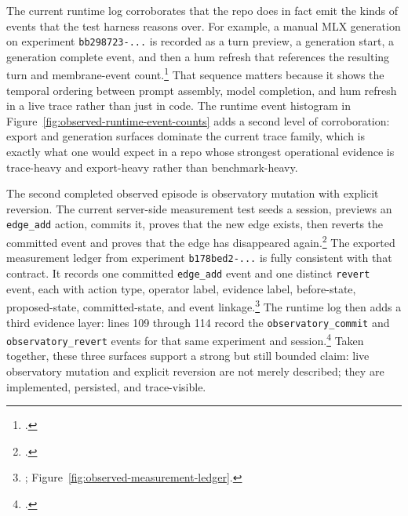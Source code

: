 \documentclass[10pt]{article}
\begin{document}
The current runtime log corroborates that the repo does in fact emit the kinds of events that the test harness reasons over. For example, a manual MLX generation on experiment \texttt{bb298723-...} is recorded as a turn preview, a generation start, a generation complete event, and then a hum refresh that references the resulting turn and membrane-event count.\footnote{.} That sequence matters because it shows the temporal ordering between prompt assembly, model completion, and hum refresh in a live trace rather than just in code. The runtime event histogram in Figure~\ref{fig:observed-runtime-event-counts} adds a second level of corroboration: export and generation surfaces dominate the current trace family, which is exactly what one would expect in a repo whose strongest operational evidence is trace-heavy and export-heavy rather than benchmark-heavy.

The second completed observed episode is observatory mutation with explicit reversion. The current server-side measurement test seeds a session, previews an \texttt{edge\_add} action, commits it, proves that the new edge exists, then reverts the committed event and proves that the edge has disappeared again.\footnote{.} The exported measurement ledger from experiment \texttt{b178bed2-...} is fully consistent with that contract. It records one committed \texttt{edge\_add} event and one distinct \texttt{revert} event, each with action type, operator label, evidence label, before-state, proposed-state, committed-state, and event linkage.\footnote{; Figure~\ref{fig:observed-measurement-ledger}.} The runtime log then adds a third evidence layer: lines 109 through 114 record the \texttt{observatory\_commit} and \texttt{observatory\_revert} events for that same experiment and session.\footnote{.} Taken together, these three surfaces support a strong but still bounded claim: live observatory mutation and explicit reversion are not merely described; they are implemented, persisted, and trace-visible.
\end{document}
